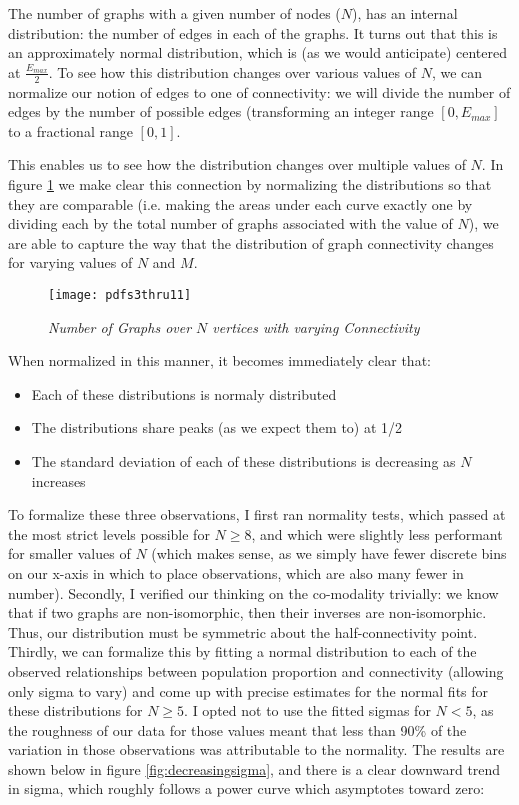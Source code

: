 The number of graphs with a given number of nodes ($N$), has an internal distribution: the number of edges in each of the graphs.
It turns out that this is an approximately normal distribution, which is (as we would anticipate) centered at $\frac{E_{max}}{2}$. 
To see how this distribution changes over various values of $N$, we can normalize our notion of edges to one of connectivity:
we will divide the number of edges by the number of possible edges (transforming an integer range $[0, E_{max}]$ to a fractional range $[0, 1]$.

This enables us to see how the distribution changes over multiple values of $N$.
In figure \ref{fig:ngraphs} we make clear this connection by normalizing the distributions so that they are comparable (i.e. making the areas under each curve exactly one by dividing each by the total number of graphs associated with the value of $N$), we are able to capture the way that the distribution of graph connectivity changes for varying values of $N$ and $M$.

\begin{figure}[h]
\caption{\emph{Number of Graphs over $N$ vertices with varying Connectivity}}
\centering
\texttt{[image: pdfs3thru11]}
\label{fig:ngraphs}
\end{figure}

When normalized in this manner, it becomes immediately clear that:
\begin{itemize}
\item{Each of these distributions is normaly distributed}
\item{The distributions share peaks (as we expect them to) at 1/2}
\item{The standard deviation of each of these distributions is decreasing as $N$ increases}
\end{itemize}

To formalize these three observations, I first ran normality tests, which passed at the most strict levels possible for $N \geq 8$, and which were slightly less performant for smaller values of $N$ (which makes sense, as we simply have fewer discrete bins on our x-axis in which to place observations, which are also many fewer in number).
Secondly, I verified our thinking on the co-modality trivially: we know that if two graphs are non-isomorphic, then their inverses are non-isomorphic.
Thus, our distribution must be symmetric about the half-connectivity point.
Thirdly, we can formalize this by fitting a normal distribution to each of the observed relationships between population proportion and connectivity (allowing only sigma to vary) and come up with precise estimates for the normal fits for these distributions for $N \geq 5$.
I opted not to use the fitted sigmas for $N < 5$, as the roughness of our data for those values meant that less than 90\% of the variation in those observations was attributable to the normality.
The results are shown below in figure \ref{fig:decreasingsigma}, and there is a clear downward trend in sigma, which roughly follows a power curve which asymptotes toward zero:

